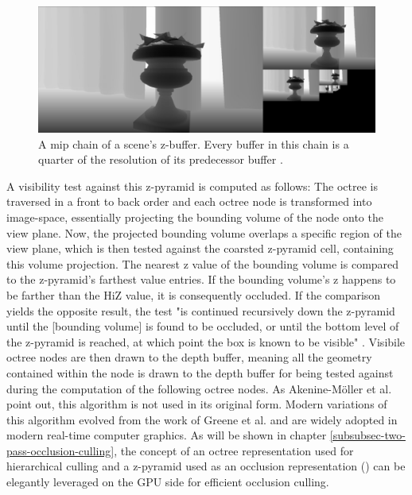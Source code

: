 \begin{figure}[h]
    \centering
    \includegraphics[width=\linewidth]{images/graphics/hiz-mip-chain.jpg}
    \caption{A mip chain of a scene's z-buffer. Every buffer in this chain is a quarter of the resolution of its 
    predecessor buffer \cite{Schachtschabel2017}.}
    \label{fig:hiz-mip-chain}
\end{figure}

\noindent
A visibility test against this z-pyramid is computed as follows: The octree is traversed in a front to back order 
and each octree node is transformed into image-space, essentially projecting the bounding volume of the node onto 
the view plane. Now, the projected bounding volume overlaps a specific region of the view plane, which is then 
tested against the coarsted z-pyramid cell, containing this volume projection. The nearest z value of the bounding 
volume is compared to the z-pyramid's farthest value entries. If the bounding volume's z happens to be farther than the 
\ac{HiZ} value, it is consequently occluded. If the comparison yields the opposite result, the test "is continued 
recursively down the z-pyramid until the [bounding volume] is found to be occluded, or until the bottom level of the 
z-pyramid is reached, at which point the box is known to be visible" \cite{AkenineMoeller2018}. Visibile octree nodes 
are then drawn to the depth buffer, meaning all the geometry contained within the node is drawn to the depth buffer 
for being tested against during the computation of the following octree nodes. As Akenine-Möller et al. 
\cite{AkenineMoeller2018} point out, this algorithm is not used in its original form. Modern variations of this 
algorithm evolved from the work of Greene et al. \cite{Greene93} and are widely adopted in modern real-time computer 
graphics. As will be shown in chapter \ref{subsubsec-two-pass-occlusion-culling}, the concept of an octree representation 
used for hierarchical culling and a z-pyramid used as an occlusion representation (\cite{AkenineMoeller2018}) can be 
elegantly leveraged on the \ac{GPU} side for efficient occlusion culling.


